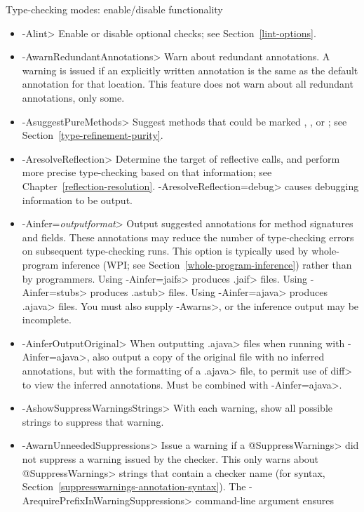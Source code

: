 Type-checking modes:  enable/disable functionality
\begin{itemize}
\item \<-Alint>
  Enable or disable optional checks; see Section~\ref{lint-options}.
\item \<-AwarnRedundantAnnotations>
  Warn about redundant annotations.
  A warning is issued if an explicitly written annotation
  is the same as the default annotation for that location.
  This feature does not warn about all redundant annotations, only some.
\item \<-AsuggestPureMethods>
  Suggest methods that could be marked
  ,
  ,
  or ; see
  Section~\ref{type-refinement-purity}.
\item \<-AresolveReflection>
  Determine the target of reflective calls, and perform more precise
  type-checking based on that information; see
  Chapter~\ref{reflection-resolution}.  \<-AresolveReflection=debug> causes
  debugging information to be output.
\item \<-Ainfer=\emph{outputformat}>
  Output suggested annotations for method signatures and fields.
  These annotations may reduce the number of type-checking
  errors on subsequent type-checking runs.  This option is
  typically used by whole-program inference (WPI; see
  Section~\ref{whole-program-inference}) rather than by programmers.
  Using \<-Ainfer=jaifs> produces \<.jaif> files.
  Using \<-Ainfer=stubs> produces \<.astub> files.
  Using \<-Ainfer=ajava> produces \<.ajava> files.
  You must also supply \<-Awarns>, or the inference output may be incomplete.
\item \<-AinferOutputOriginal>
  When outputting \<.ajava> files when running with \<-Ainfer=ajava>,
  also output a copy of the original file with no inferred annotations,
  but with the formatting of a \<.ajava> file, to permit use of \<diff>
  to view the inferred annotations. Must be combined with \<-Ainfer=ajava>.
\item \<-AshowSuppressWarningsStrings>
  With each warning, show all possible strings to suppress that warning.
\item \<-AwarnUnneededSuppressions>
  Issue a warning if a \<@SuppressWarnings> did not suppress a warning
  issued by the checker.  This only warns about
  \<@SuppressWarnings> strings that contain a checker name
  (for syntax, Section~\ref{suppresswarnings-annotation-syntax}).  The
  \<-ArequirePrefixInWarningSuppressions> command-line argument ensures

\end{itemize}
